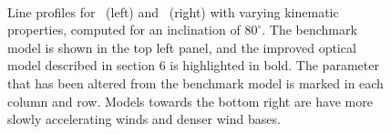 \documentclass[preprint, a4paper, 11pt]{aastex}
\begin{document}
\begin{figure} %
\mbox{
\quad
{}   
}
\caption{
Line profiles for \ha\ (left) and \hb\ (right) with varying kinematic 
properties, computed for an inclination of $80^\circ$.
The benchmark model is shown in the top left panel, and the improved optical
model described in section 6 is highlighted in bold. 
The parameter that has been altered from the benchmark model 
is marked in each column and row. 
Models towards the bottom right
are have more slowly accelerating winds and denser wind bases. 
}
\label{halpha}
\end{figure} %
\end{document}
